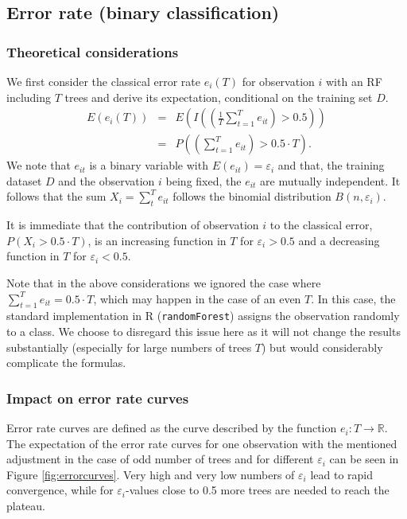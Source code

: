 \documentclass[paper=a4
               ,12pt
               ,DIV=12
               ,parskip=half
               ,titlepage=on
               ,headinclude 
               ,footinclude
               ,headsepline
               ,footsepline         %
               ,ilines 
               ]{scrartcl}
\begin{document}
\subsection{Error rate (binary classification)}
\subsubsection{Theoretical considerations}
We first consider the classical error rate $e_i(T)$ for observation $i$ with an RF including $T$ trees and derive its expectation, conditional on the training set $D$. 
\begin{eqnarray*}
 E(e_i(T)) & = &  E \left(I \left( \left(\frac{1}{T} \sum_{t=1}^T e_{it} \right) > 0.5 \right) \right)\\
 & = & P \left( \left(\sum_{t=1}^T e_{it} \right) > 0.5 \cdot T \right). 
\end{eqnarray*}
We note that $e_{it}$ is a binary variable with $E(e_{it})=\varepsilon_i$ and that, the training dataset $D$ and the observation $i$ being fixed, the $e_{it}$ are mutually independent. It follows that  the sum $X_i=\sum_{t}^Te_{it}$ 
follows the binomial distribution $B(n, \varepsilon_i)$. 

It is immediate that the contribution of observation $i$ to the classical error, $P(X_i>0.5 \cdot T)$, is an increasing function in $T$ for $\varepsilon_i > 0.5$ and a decreasing function in $T$ for $\varepsilon_i < 0.5$. 

Note that in the above considerations we ignored the case where $\sum_{t=1}^T e_{it}  = 0.5 \cdot T$, which may happen in the case of an even $T$. In this case, the standard implementation in R (\texttt{randomForest}) assigns the observation randomly 
to a class. We choose to disregard this issue here as it will not change the results substantially (especially for large numbers of trees $T$) but would considerably complicate the formulas.  

\subsubsection{Impact on error rate curves}
Error rate curves are defined as the curve described by the function $e_i: T \rightarrow \mathbb{R}$.
The expectation of the error rate curves for one observation with the mentioned adjustment in the case of odd number of trees and for different $\varepsilon_i$ can be seen in Figure \ref{fig:errorcurves}. 
Very high and very low numbers of $\varepsilon_i$ lead to rapid convergence, while for $\varepsilon_i$-values close to 0.5 more trees are needed to reach the plateau. 
\end{document}

